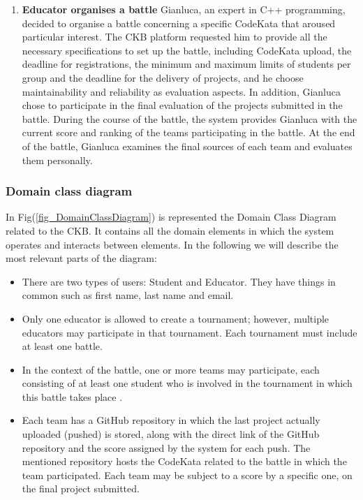 \begin{enumerate}
    \item \textbf{Educator organises a battle}
    \newline
    Gianluca, an expert in C++ programming, decided to organise a battle concerning a specific CodeKata that aroused particular interest. The CKB platform requested him to provide all the necessary specifications to set up the battle, including CodeKata upload, the deadline for registrations, the minimum and maximum limits of students per group and the deadline for the delivery of projects, and he choose maintainability and reliability as evaluation aspects.
    \newline
    In addition, Gianluca chose to participate in the final evaluation of the projects submitted in the battle.
    \newline
    During the course of the battle, the system provides Gianluca with the current score and ranking of the teams participating in the battle. At the end of the battle, Gianluca examines the final sources of each team and evaluates them personally.
    


\end{enumerate}


\vspace{0.5\baselineskip}
\subsubsection{Domain class diagram}
In Fig(\ref{fig_DomainClassDiagram}) is represented the Domain Class Diagram related to the CKB. It contains all the domain elements in which the system operates and interacts between elements. In the following we will describe the most relevant parts of the diagram: 
\begin{itemize}
    \item There are two types of users: Student and Educator. They have things in common such as first name, last name and email.
    
    \item Only one educator is allowed to create a tournament; however, multiple educators may participate in that tournament. Each tournament must include at least one battle.
    
    \item In the context of the battle, one or more teams may participate, each consisting of at least one student who is involved in the tournament in which this battle takes place .
    
    \item Each team has a GitHub repository in which the last project actually uploaded (pushed) is stored, along with the direct link of the GitHub repository and the score assigned by the system for each push. The mentioned repository hosts the CodeKata related to the battle in which the team participated. Each team may be subject to a score by a specific one, on the final project submitted.


\end{itemize}

